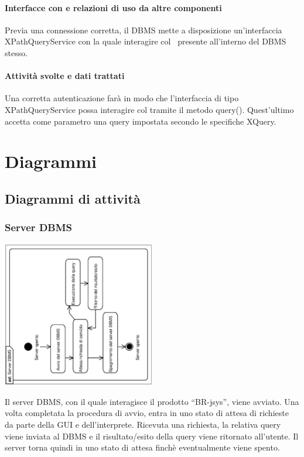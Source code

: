 \documentclass[11pt,titlepage,a4paper]{report}
\begin{document}
\subsubsection{Interfacce con e relazioni di uso da altre componenti}
Previa una connessione corretta, il DBMS mette a disposizione un'interfaccia XPathQueryService con la quale interagire col \re\ presente all'interno del DBMS stesso.
\subsubsection{Attivit\`a svolte e dati trattati}
Una corretta autenticazione far\`a in modo che l'interfaccia di tipo XPathQueryService possa interagire col \re tramite il metodo query(). Quest'ultimo accetta come parametro una query impostata secondo le specifiche XQuery.

\chapter{Diagrammi}
\section{Diagrammi di attivit\`a}


\subsection{Server DBMS}
\begin{center}
 \includegraphics[width=0.5\textwidth, angle=-90]{Server.eps}
\end{center}
Il server DBMS, con il quale interagisce il prodotto ``BR-jsys'', viene avviato. Una volta completata la procedura di avvio, entra in uno stato di attesa di richieste da parte della GUI e dell'interprete. Ricevuta una richiesta, la relativa query viene inviata al DBMS e il risultato/esito della query viene ritornato all'utente. Il server torna quindi in uno stato di attesa finch\`e eventualmente viene spento.
\end{document}

